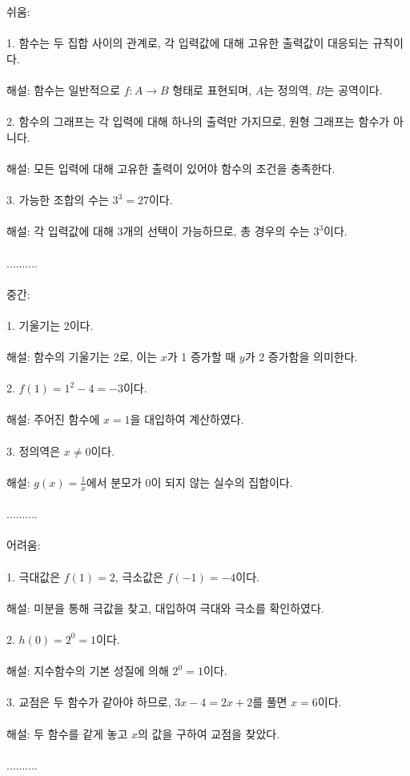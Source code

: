 \documentclass[fleqn]{article}
\begin{document}
      
        

쉬움: \\\\  
1. 함수는 두 집합 사이의 관계로, 각 입력값에 대해 고유한 출력값이 대응되는 규칙이다. \\\\  
   해설: 함수는 일반적으로 $f : A \to B$ 형태로 표현되며, $A$는 정의역, $B$는 공역이다. \\\\  
2. 함수의 그래프는 각 입력에 대해 하나의 출력만 가지므로, 원형 그래프는 함수가 아니다. \\\\  
   해설: 모든 입력에 대해 고유한 출력이 있어야 함수의 조건을 충족한다. \\\\  
3. 가능한 조합의 수는 $3^3 = 27$이다. \\\\  
   해설: 각 입력값에 대해 3개의 선택이 가능하므로, 총 경우의 수는 $3^3$이다. \\\\  
.......... \\\\  

중간: \\\\  
1. 기울기는 2이다. \\\\  
   해설: 함수의 기울기는 $2$로, 이는 $x$가 1 증가할 때 $y$가 2 증가함을 의미한다. \\\\  
2. $f(1) = 1^2 - 4 = -3$이다. \\\\  
   해설: 주어진 함수에 $x = 1$을 대입하여 계산하였다. \\\\  
3. 정의역은 $x \neq 0$이다. \\\\  
   해설: $g(x) = \frac{1}{x}$에서 분모가 0이 되지 않는 실수의 집합이다. \\\\  
.......... \\\\  

어려움: \\\\  
1. 극대값은 $f(1) = 2$, 극소값은 $f(-1) = -4$이다. \\\\  
   해설: 미분을 통해 극값을 찾고, 대입하여 극대와 극소를 확인하였다. \\\\  
2. $h(0) = 2^0 = 1$이다. \\\\  
   해설: 지수함수의 기본 성질에 의해 $2^0 = 1$이다. \\\\  
3. 교점은 두 함수가 같아야 하므로, $3x - 4 = 2x + 2$를 풀면 $x = 6$이다. \\\\  
   해설: 두 함수를 같게 놓고 $x$의 값을 구하여 교점을 찾았다. \\\\  
.......... \\\\        
      
\end{document}
